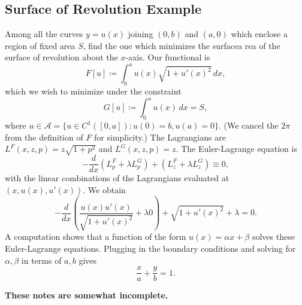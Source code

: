 \documentclass[11pt]{article}
\begin{document}
\subsection{Surface of Revolution Example}

Among all the curves $y = u(x)$ joining $(0, b)$ and $(a, 0)$ which enclose a region of fixed area $S$, find the one which minimizes the surfacea rea of the surface of revolution about the $x$-axis. Our functional is
\[
F[u] \coloneqq \int_0^a  u(x) \sqrt{1 + u'(x)^2} \, dx,
\]
which we wish to minimize under the constraint
\[
G[u] \coloneqq \int_0^a u(x) \, dx = S,
\]
where $u \in \mathcal{A} = \{ u \in C^1([0, a]) : u(0) = b, u(a) = 0 \}$. (We cancel the $2\pi$ from the definition of $F$ for simplicity.) The Lagrangians are $L^F(x,z,p) = z\sqrt{1 + p^2}$ and $L^G(x,z,p) = z$. The Euler-Lagrange equation is
\[
-\frac{d}{dx} (L^F_p + \lambda L^G_p) + (L^F_z + \lambda L^G_z) \equiv 0,
\]
with the linear combinations of the Lagrangians evaluated at $(x, u(x), u'(x))$. We obtain
\[
-\frac{d}{dx} \left( \frac{u(x)u'(x)}{\sqrt{1 + u'(x)^2}} + \lambda 0 \right) + \sqrt{1 + u'(x)^2} + \lambda = 0.
\]
A computation shows that a function of the form $u(x) = \alpha x + \beta$ solves these Euler-Lagrange equations. Plugging in the boundary conditions and solving for $\alpha, \beta$ in terms of $a, b$ gives
\[
\frac{x}{a} + \frac{y}{b} = 1.
\]

\textbf{These notes are somewhat incomplete.}
\end{document}

